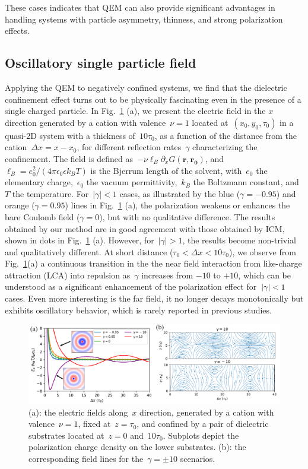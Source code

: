 These cases indicates that QEM can also provide significant advantages in handling systems with particle asymmetry, thinness, and strong polarization effects.


\subsection{Oscillatory single particle field}

Applying the QEM to negatively confined systems, we find that the dielectric confinement effect turns out to be physically fascinating even in the presence of a single charged particle. 
In Fig.~\ref{fig:force_x} (a), we present the electric field in the $x$ direction generated by a cation with valence~$\nu=1$ located at~$(x_0, y_0, \tau_0)$ in a quasi-2D system with a thickness of~$10\tau_0$, as a function of the distance from the cation~$\Delta x=x-x_0$, for different reflection rates~$\gamma$ characterizing the confinement. 
The field is defined as~$-\nu\ell_B\partial_x G(\mathbf{r}, \mathbf{r_0})$, and~$\ell_B=e_0^2/(4\pi\epsilon_0\epsilon k_B T)$ is the Bjerrum length of the solvent, with~$e_0$ the elementary charge,~$\epsilon_0$ the vacuum permittivity,~$k_B$ the Boltzmann constant, and~$T$ the temperature. 
For~$\vert\gamma\vert<1$ cases, as illustrated by the blue ($\gamma=-0.95$) and orange ($\gamma=0.95$) lines in Fig.~\ref{fig:force_x} (a), the polarization weakens or enhances the bare Coulomb field ($\gamma=0$), but with no qualitative difference. 
The results obtained by our method are in good agreement with those obtained by ICM, shown in dots in Fig.~\ref{fig:force_x} (a). 
However, for~$\vert\gamma\vert>1$, the results become non-trivial and qualitatively different. 
At short distance ($\tau_0<\Delta x < 10\tau_0$), we observe from Fig.~\ref{fig:force_x}(a) a continuous transition in the the near field interaction from like-charge attraction (LCA) into repulsion as~$\gamma$ increases from $-10$ to $+10$,
which can be understood as a significant enhancement of the polarization effect for~$\lvert\gamma\rvert<1$ cases.
Even more interesting is the far field, it no longer decays monotonically but exhibits oscillatory behavior, which is rarely reported in previous studies.

\begin{figure}[htbp]
	\centering
	\includegraphics[width=1\textwidth]{figs/fig2.pdf}
	\caption{(a): the electric fields along~$x$ direction, generated by a cation with valence~$\nu=1$, fixed at~$z=\tau_0$, and confined by a pair of dielectric substrates located at~$z=0$ and~$10\tau_0$. Subplots depict the polarization charge density on the lower substrates. 
    (b): the corresponding field lines for the~$\gamma=\pm10$ scenarios.
		\label{fig:force_x}
            }
\end{figure}

